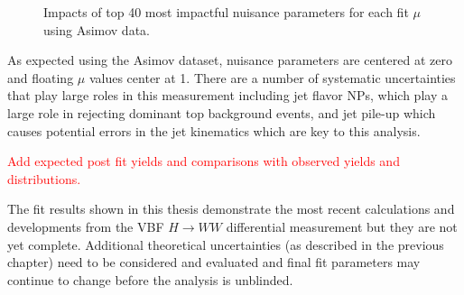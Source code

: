 \begin{figure}[!h]
{  }\hfill
{\caption{Impacts of top 40 most impactful nuisance parameters for each fit $\mu$ using Asimov data.
\label{fig:impacts}}}
\end{figure}

As expected using the Asimov dataset, nuisance parameters are centered at zero and floating $\mu$ values center at 1. There are a number of systematic uncertainties that play large roles in this measurement including jet flavor NPs, which play a large role in rejecting dominant top background events, and jet pile-up which causes potential errors in the jet kinematics which are key to this analysis. 

\textcolor{red}{Add expected post fit yields and comparisons with observed yields and distributions.}

The fit results shown in this thesis demonstrate the most recent calculations and developments from the VBF $H\rightarrow WW$ differential measurement but they are not yet complete. Additional theoretical uncertainties (as described in the previous chapter) need to be considered and evaluated and final fit parameters may continue to change before the analysis is unblinded. 


